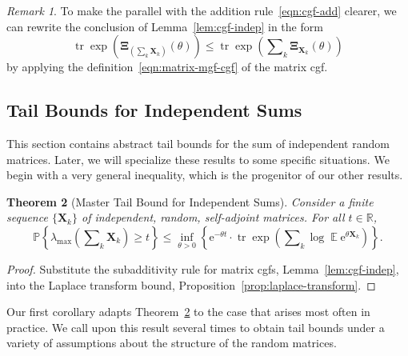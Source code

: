 \documentclass[11pt,letterpaper,twoside,reqno,draft]{amsart}
\newtheorem{thm}{Theorem}
\theoremstyle{remark}
\newtheorem{rem}[thm]{Remark}
\numberwithin{equation}{section}
\numberwithin{thm}{section}
\begin{document}
\begin{rem}
To make the parallel with the addition rule~\eqref{eqn:cgf-add} clearer, we can rewrite the conclusion of Lemma~\ref{lem:cgf-indep} in the form
$$
{\operatorname{tr}} \exp\left( {\bm{{\Xi}}}_{(\sum_k {\bm{{X}}}_k)}(\theta) \right)
	\leq {\operatorname{tr}} \exp\left( \sum\nolimits_k {\bm{{\Xi}}}_{{\bm{{X}}}_k}(\theta) \right)
$$
by applying the definition~\eqref{eqn:matrix-mgf-cgf} of the matrix cgf.
\end{rem}

\subsection{Tail Bounds for Independent Sums} \label{sec:master-tail}

This section contains abstract tail bounds for the sum of independent random matrices.  Later, we will specialize these results to some specific situations.  We begin with a very general inequality, which is the progenitor of our other results.

\begin{thm}[Master Tail Bound for Independent Sums] \label{thm:master-ineq}
Consider a finite sequence $\{ {\bm{{X}}}_k \}$ of independent, random, self-adjoint matrices.  For all $t \in \mathbb{R}$,
\begin{equation} \label{eqn:master-ineq}
{\mathbb{P}\left\{ {{ \lambda_{\max}\left( \sum\nolimits_k {\bm{{X}}}_k \right) \geq t }} \right\}}
	\leq \inf_{\theta > 0} \left\{ {\mathrm{e}}^{-\theta t}
	\cdot {\operatorname{tr}} \exp\left( \sum\nolimits_k
	 \log {\operatorname{\mathbb{E}}} {\mathrm{e}}^{\theta {\bm{{X}}}_k} \right)
	\right\}.
\end{equation}
\end{thm}

\begin{proof}
Substitute the subadditivity rule for matrix cgfs, Lemma~\ref{lem:cgf-indep}, into the Laplace transform bound, Proposition~\ref{prop:laplace-transform}.
\end{proof}

Our first corollary adapts Theorem~\ref{thm:master-ineq} to the case that arises most often in practice.  We call upon this result several times to obtain tail bounds under a variety of assumptions about the structure of the random matrices.
\end{document}
